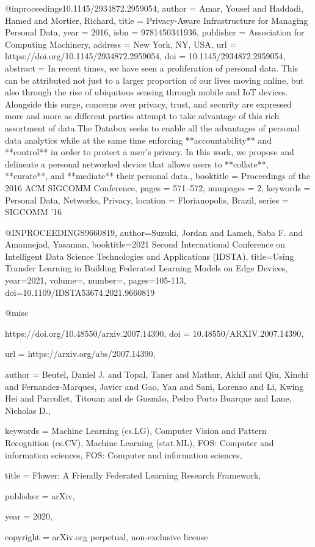 @inproceedings{10.1145/2934872.2959054,
author = {Amar, Yousef and Haddadi, Hamed and Mortier, Richard},
title = {Privacy-Aware Infrastructure for Managing Personal Data},
year = {2016},
isbn = {9781450341936},
publisher = {Association for Computing Machinery},
address = {New York, NY, USA},
url = {https://doi.org/10.1145/2934872.2959054},
doi = {10.1145/2934872.2959054},
abstract = {In recent times, we have seen a proliferation of personal data. This can be attributed not just to a larger proportion of our lives moving online, but also through the rise of ubiquitous sensing through mobile and IoT devices. Alongside this surge, concerns over privacy, trust, and security are expressed more and more as different parties attempt to take advantage of this rich assortment of data.The Databox seeks to enable all the advantages of personal data analytics while at the same time enforcing **accountability** and **control** in order to protect a user's privacy. In this work, we propose and delineate a personal networked device that allows users to **collate**, **curate**, and **mediate** their personal data.},
booktitle = {Proceedings of the 2016 ACM SIGCOMM Conference},
pages = {571–572},
numpages = {2},
keywords = {Personal Data, Networks, Privacy},
location = {Florianopolis, Brazil},
series = {SIGCOMM '16}
}

@INPROCEEDINGS{9660819,  author={Suzuki, Jordan and Lameh, Saba F. and Amannejad, Yasaman},  booktitle={2021 Second International Conference on Intelligent Data Science Technologies and Applications (IDSTA)},   title={Using Transfer Learning in Building Federated Learning Models on Edge Devices},   year={2021},  volume={},  number={},  pages={105-113},  doi={10.1109/IDSTA53674.2021.9660819}}

@misc{https://doi.org/10.48550/arxiv.2007.14390,
  doi = {10.48550/ARXIV.2007.14390},
  
  url = {https://arxiv.org/abs/2007.14390},
  
  author = {Beutel, Daniel J. and Topal, Taner and Mathur, Akhil and Qiu, Xinchi and Fernandez-Marques, Javier and Gao, Yan and Sani, Lorenzo and Li, Kwing Hei and Parcollet, Titouan and de Gusmão, Pedro Porto Buarque and Lane, Nicholas D.},
  
  keywords = {Machine Learning (cs.LG), Computer Vision and Pattern Recognition (cs.CV), Machine Learning (stat.ML), FOS: Computer and information sciences, FOS: Computer and information sciences},
  
  title = {Flower: A Friendly Federated Learning Research Framework},
  
  publisher = {arXiv},
  
  year = {2020},
  
  copyright = {arXiv.org perpetual, non-exclusive license}
}

